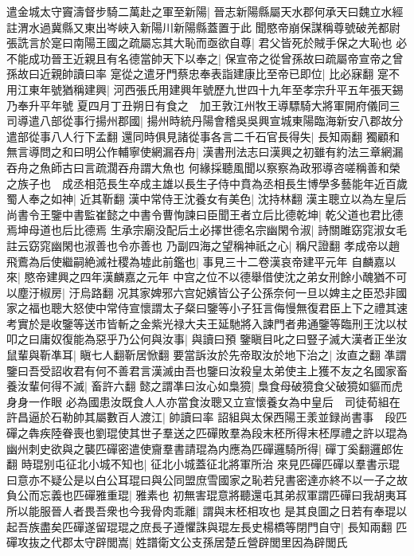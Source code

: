 遣金城太守竇濤督步騎二萬赴之軍至新陽|{
	晉志新陽縣屬天水郡何承天曰魏立水經註渭水過冀縣又東出岑峽入新陽川新陽縣蓋置于此}
聞愍帝崩保謀稱尊號破羌都尉張詵言於寔曰南陽王國之疏屬忘其大恥而亟欲自尊|{
	君父皆死於賊手保之大恥也}
必不能成功晉王近親且有名德當帥天下以奉之|{
	保宣帝之從曾孫故曰疏屬帝宣帝之曾孫故曰近親帥讀曰率}
寔從之遣牙門蔡忠奉表詣建康比至帝已即位|{
	比必寐翻}
寔不用江東年號猶稱建興|{
	河西張氏用建興年號歷九世四十九年至孝宗升平五年張天錫乃奉升平年號}
夏四月丁丑朔日有食之　加王敦江州牧王導驃騎大將軍開府儀同三司導遣八部從事行揚州郡國|{
	揚州時統丹陽會稽吳吳興宣城東陽臨海新安八郡故分遣部從事八人行下孟翻}
還同時俱見諸從事各言二千石官長得失|{
	長知兩翻}
獨顧和無言導問之和曰明公作輔寧使網漏吞舟|{
	漢書刑法志曰漢興之初雖有約法三章網漏吞舟之魚師古曰言疏濶吞舟謂大魚也}
何緣採聽風聞以察察為政邪導咨嗟稱善和榮之族子也　成丞相范長生卒成主雄以長生子侍中賁為丞相長生博學多藝能年近百歲蜀人奉之如神|{
	近其靳翻}
漢中常侍王沈養女有美色|{
	沈持林翻}
漢主聰立以為左皇后尚書令王鑒中書監崔懿之中書令曹恂諫曰臣聞王者立后比德乾坤|{
	乾父道也君比德焉坤母道也后比德焉}
生承宗廟没配后土必擇世德名宗幽閑令淑|{
	詩關雎窈窕淑女毛註云窈窕幽閑也淑善也令亦善也}
乃副四海之望稱神祇之心|{
	稱尺證翻}
孝成帝以趙飛鷰為后使繼嗣絶滅社稷為墟此前鑑也|{
	事見三十二卷漢哀帝建平元年}
自麟嘉以來|{
	愍帝建興之四年漢麟嘉之元年}
中宫之位不以德舉借使沈之弟女刑餘小醜猶不可以塵汙椒房|{
	汙烏路翻}
况其家婢邪六宫妃嬪皆公子公孫奈何一旦以婢主之臣恐非國家之福也聰大怒使中常侍宣懷謂太子粲曰鑒等小子狂言侮慢無復君臣上下之禮其速考實於是收鑒等送市皆斬之金紫光禄大夫王延馳將入諫門者弗通鑒等臨刑王沈以杖叩之曰庸奴復能為惡乎乃公何與汝事|{
	與讀曰預}
鑒瞋目叱之曰豎子滅大漢者正坐汝鼠輩與靳凖耳|{
	瞋七人翻靳居惞翻}
要當訴汝於先帝取汝於地下治之|{
	汝直之翻}
凖謂鑒曰吾受詔收君有何不善君言漢滅由吾也鑒曰汝殺皇太弟使主上獲不友之名國家畜養汝輩何得不滅|{
	畜許六翻}
懿之謂凖曰汝心如梟獍|{
	梟食母破獍食父破獍如貙而虎身身一作眼}
必為國患汝既食人人亦當食汝聰又立宣懷養女為中皇后　司徒荀組在許昌逼於石勒帥其屬數百人渡江|{
	帥讀曰率}
詔組與太保西陽王羕並録尚書事　段匹磾之犇疾陸眷喪也劉琨使其世子羣送之匹磾敗羣為段末柸所得末柸厚禮之許以琨為幽州刺史欲與之襲匹磾密遣使齎羣書請琨為内應為匹磾邏騎所得|{
	磾丁奚翻邏郎佐翻}
時琨别屯征北小城不知也|{
	征北小城蓋征北將軍所治}
來見匹磾匹磾以羣書示琨曰意亦不疑公是以白公耳琨曰與公同盟庶雪國家之恥若兒書密達亦終不以一子之故負公而忘義也匹磾雅重琨|{
	雅素也}
初無害琨意將聽還屯其弟叔軍謂匹磾曰我胡夷耳所以能服晉人者畏吾衆也今我骨肉乖離|{
	謂與末柸相攻也}
是其良圖之日若有奉琨以起吾族盡矣匹磾遂留琨琨之庶長子遵懼誅與琨左長史楊橋等閉門自守|{
	長知兩翻}
匹磾攻抜之代郡太守辟閭嵩|{
	姓譜衛文公支孫居楚丘營辟閭里因為辟閭氏}
